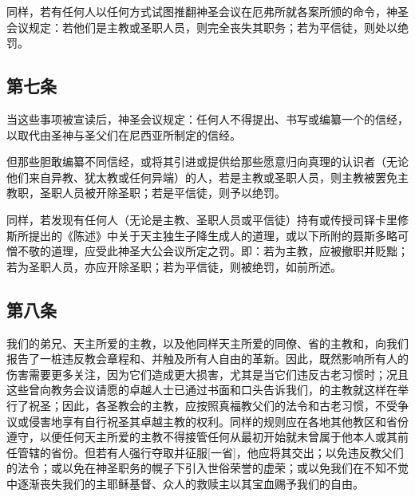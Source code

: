 同样，若有任何人以任何方式试图推翻神圣会议在厄弗所就各案所颁的命令，神圣会议规定：若他们是主教或圣职人员，则完全丧失其职务；若为平信徒，则处以绝罚。\par


\subsection{第七条}

当这些事项被宣读后，神圣会议规定：任何人不得提出、书写或编纂一个的信经，以取代由圣神与圣父们在尼西亚所制定的信经。\par

但那些胆敢编纂不同信经，或将其引进或提供给那些愿意归向真理的认识者（无论他们来自异教、犹太教或任何异端）的人，若是主教或圣职人员，则主教被罢免主教职，圣职人员被开除圣职；若是平信徒，则予以绝罚。\par

同样，若发现有任何人（无论是主教、圣职人员或平信徒）持有或传授司铎卡里修斯所提出的《陈述》中关于天主独生子降生成人的道理，或以下所附的聂斯多略可憎不敬的道理，应受此神圣大公会议所定之罚。即：若为主教，应被撤职并贬黜；若为圣职人员，亦应开除圣职；若为平信徒，则被绝罚，如前所述。\par


\subsection{第八条}

我们的弟兄、天主所爱的主教，以及他同样天主所爱的同僚、省的主教和，向我们报告了一桩违反教会章程和、并触及所有人自由的革新。因此，既然影响所有人的伤害需要更多关注，因为它们造成更大损害，尤其是当它们违反古老习惯时；况且这些曾向教务会议请愿的卓越人士已通过书面和口头告诉我们，的主教就这样在举行了祝圣；因此，各圣教会的主教，应按照真福教父们的法令和古老习惯，不受争议或侵害地享有自行祝圣其卓越主教的权利。同样的规则应在各地其他教区和省份遵守，以便任何天主所爱的主教不得接管任何从最初开始就未曾属于他本人或其前任管辖的省份。但若有人强行夺取并征服[一省]，他应将其交出；以免违反教父们的法令；或以免在神圣职务的幌子下引入世俗荣誉的虚荣；或以免我们在不知不觉中逐渐丧失我们的主耶稣基督、众人的救赎主以其宝血赐予我们的自由。\par


